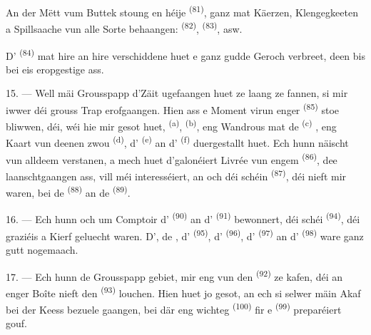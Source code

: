 An der Mëtt vum Buttek stoung en héije  \textsuperscript{(81)},
ganz mat Käerzen, Klengegkeeten a Spillsaache vun alle Sorte behaangen:
 \textsuperscript{(82)},  \textsuperscript{(83)}, asw.

D' \textsuperscript{(84)} mat hire  an hire
verschiddene  huet e ganz gudde Geroch verbreet, deen bis bei eis
eropgestige ass.

\VUsaut{3.4mm}
\VUsaut{2.8mm}

15. --- Well mäi Grousspapp d'Zäit ugefaangen huet ze laang ze fannen, si mir iwwer
déi grouss Trap erofgaangen. Hien ass e Moment virun enger 
\textsuperscript{(85)} stoe bliwwen, déi, wéi hie mir gesot huet, 
\textsuperscript{(a)},  \textsuperscript{(b)}, eng
Wandrous mat de  \textsuperscript{(c)}
, eng Kaart vun deenen zwou
 \textsuperscript{(d)}, d'
\textsuperscript{(e)} an d' \textsuperscript{(f)} duergestallt
huet. Ech hunn näischt vun alldeem verstanen, a mech huet d'galonéiert Livrée vun
engem  \textsuperscript{(86)}, dee laanschtgaangen ass, vill méi
interesséiert, an och déi schéin  \textsuperscript{(87)}, déi nieft
mir waren, bei de  \textsuperscript{(88)} an de
 \textsuperscript{(89)}.

16. --- Ech hunn och um Comptoir d' \textsuperscript{(90)} an
d' \textsuperscript{(91)} bewonnert, déi schéi
 \textsuperscript{(94)}, déi graziéis a Kierf geluecht
waren. D', de , d'
\textsuperscript{(95)}, d' \textsuperscript{(96)},
d' \textsuperscript{(97)} an d'
\textsuperscript{(98)} ware ganz gutt nogemaach.

\VUsaut{4.4mm}
\VUsaut{2.8mm}

17. --- Ech hunn de Grousspapp gebiet, mir eng vun den 
\textsuperscript{(92)} ze kafen, déi an enger Boîte nieft den 
\textsuperscript{(93)} louchen. Hien huet jo gesot, an ech si selwer mäin Akaf bei der
Keess bezuele gaangen, bei där eng wichteg  \textsuperscript{(100)}
fir e  \textsuperscript{(99)} preparéiert gouf.


